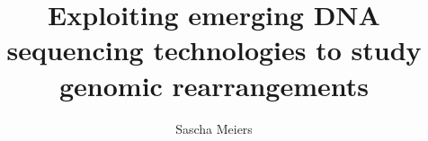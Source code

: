 \documentclass[twoside, titlepage, DIV=8, BCOR=8.5mm, open=right, chapterprefix=false]{scrbook}
\title{Exploiting emerging DNA sequencing technologies to study genomic rearrangements}
\author{Sascha Meiers}
\begin{document}


\maketitle
\tableofcontents
\listofabbrev
\listoffigs
\listoftabs









\listofreferences
\end{document}
